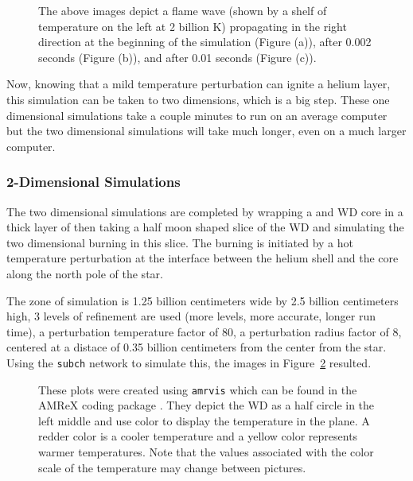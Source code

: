 \documentclass[preprint]{aastex62}
\begin{document}
    \begin{figure}
      \caption{The above images depict a flame wave (shown by a shelf of temperature on the left at 2 billion K) propagating in the right direction at the beginning of the simulation (Figure (a)), after 0.002 seconds (Figure (b)), and after 0.01 seconds (Figure (c)).}
      \label{fig:detonation}
    \end{figure}
      
      Now, knowing that a mild temperature perturbation can ignite a helium layer, this simulation can be taken to two dimensions, which is a big step. These one dimensional simulations take a couple minutes to run on an average computer but the two dimensional simulations will take much longer, even on a much larger computer. 
      
\newpage
    
    \subsubsection{2-Dimensional Simulations}
  
      The two dimensional simulations are completed by wrapping a  and  WD core in a thick layer of  then taking a half moon shaped slice of the WD and simulating the two dimensional burning in this slice. The burning is initiated by a hot temperature perturbation at the interface between the helium shell and the core along the north pole of the star. 
      
      The zone of simulation is 1.25 billion centimeters wide by 2.5 billion centimeters high, 3 levels of refinement are used (more levels, more accurate, longer run time), a perturbation temperature factor of 80, a perturbation radius factor of 8, centered at a distace of 0.35 billion centimeters from the center from the star. Using the {\tt subch} network to simulate this, the images in Figure~\ref{fig:subchsims} resulted. 
      
      \begin{figure}
        \caption{These plots were created using {\tt amrvis} which can be found in the AMReX coding package \citep{AMREXcodes}. They depict the WD as a half circle in the left middle and use color to display the temperature in the plane. A redder color is a cooler temperature and a yellow color represents warmer temperatures. Note that the values associated with the color scale of the temperature may change between pictures. 
          }
        \label{fig:subchsims}
      \end{figure}
      
\end{document}
